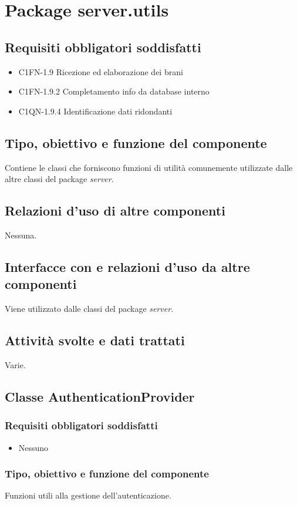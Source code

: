 \newpage
\section{Package server.utils} %
\subsection*{Requisiti obbligatori soddisfatti}
\begin{itemize}
	\item C1FN-1.9 Ricezione ed elaborazione dei brani
	\item C1FN-1.9.2 Completamento info da database interno
	\item C1QN-1.9.4 Identificazione dati ridondanti
\end{itemize}
\subsection*{Tipo, obiettivo e funzione del componente}
Contiene le classi che forniscono funzioni di utilit\`a comunemente utilizzate
dalle altre classi del package \emph{server}.
\subsection*{Relazioni d'uso di altre componenti}
Nessuna.
\subsection*{Interfacce con e relazioni d'uso da altre componenti}
Viene utilizzato dalle classi del package \emph{server}.
\subsection*{Attivit\`a svolte e dati trattati}
Varie.

\subsection{Classe AuthenticationProvider}
\subsubsection*{Requisiti obbligatori soddisfatti}
\begin{itemize}
    \item Nessuno
\end{itemize}
\subsubsection*{Tipo, obiettivo e funzione del componente}
Funzioni utili alla gestione dell'autenticazione.
